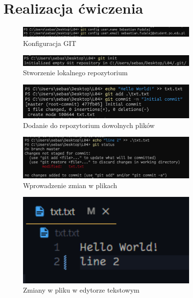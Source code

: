 \documentclass{article} %
\begin{document}
\section{Realizacja ćwiczenia}
\begin{figure}[h]
	\centering
	\includegraphics[width=0.8\textwidth]{image/git/1.png}
	\caption{Konfiguracja GIT}
\end{figure}

\begin{figure}[h]
	\centering
	\includegraphics[width=0.8\textwidth]{image/git/2.png}
	\caption{Stworzenie lokalnego repozytorium}
\end{figure}

\begin{figure}[h]
	\centering
	\includegraphics[width=0.8\textwidth]{image/git/3.png}
	\caption{Dodanie do repozytorium dowolnych plików}
\end{figure}

\begin{figure}[h]
	\centering
	\includegraphics[width=0.8\textwidth]{image/git/4.png}
	\caption{Wprowadzenie zmian w plikach}
\end{figure}

\begin{figure}[h]
	\centering
	\includegraphics[width=0.8\textwidth]{image/git/5.png}
	\caption{Zmiany w pliku w edytorze tekstowym}
\end{figure}
\end{document}
